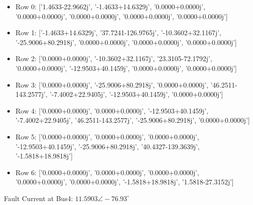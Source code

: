 \documentclass{article}
\begin{document}
	\begin{itemize}
		\item Row 0: ['1.4633-22.9662j', '-1.4633+14.6329j', '0.0000+0.0000j', '0.0000+0.0000j', '0.0000+0.0000j', '0.0000+0.0000j', '0.0000+0.0000j']
		\item Row 1: ['-1.4633+14.6329j', '37.7241-126.9765j', '-10.3602+32.1167j', '-25.9006+80.2918j', '0.0000+0.0000j', '0.0000+0.0000j', '0.0000+0.0000j']
		\item Row 2: ['0.0000+0.0000j', '-10.3602+32.1167j', '23.3105-72.1792j', '0.0000+0.0000j', '-12.9503+40.1459j', '0.0000+0.0000j', '0.0000+0.0000j']
		\item Row 3: ['0.0000+0.0000j', '-25.9006+80.2918j', '0.0000+0.0000j', '46.2511-143.2577j', '-7.4002+22.9405j', '-12.9503+40.1459j', '0.0000+0.0000j']
		\item Row 4: ['0.0000+0.0000j', '0.0000+0.0000j', '-12.9503+40.1459j', '-7.4002+22.9405j', '46.2511-143.2577j', '-25.9006+80.2918j', '0.0000+0.0000j']
		\item Row 5: ['0.0000+0.0000j', '0.0000+0.0000j', '0.0000+0.0000j', '-12.9503+40.1459j', '-25.9006+80.2918j', '40.4327-139.3639j', '-1.5818+18.9818j']
		\item Row 6: ['0.0000+0.0000j', '0.0000+0.0000j', '0.0000+0.0000j', '0.0000+0.0000j', '0.0000+0.0000j', '-1.5818+18.9818j', '1.5818-27.3152j']
	\end{itemize}
	
	\noindent
	Fault Current at Bus4: $11.5903 \angle -76.93^{\circ}$
	
\end{document}
